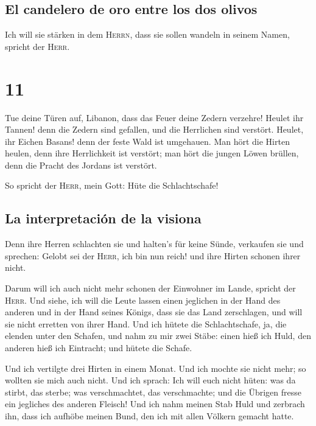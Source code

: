 \hypertarget{el-candelero-de-oro-entre-los-dos-olivos}{%
\subsection{El candelero de oro entre los dos
olivos}\label{el-candelero-de-oro-entre-los-dos-olivos}}

 Ich will sie stärken in dem \textsc{Herrn}, dass sie
sollen wandeln in seinem Namen, spricht der \textsc{Herr}.

\hypertarget{section-10}{%
\section{11}\label{section-10}}

 Tue deine Türen auf, Libanon, dass das Feuer deine Zedern
verzehre!  Heulet ihr Tannen! denn die Zedern sind
gefallen, und die Herrlichen sind verstört. Heulet, ihr Eichen Basans!
denn der feste Wald ist umgehauen.  Man hört die Hirten
heulen, denn ihre Herrlichkeit ist verstört; man hört die jungen Löwen
brüllen, denn die Pracht des Jordans ist verstört.

 So spricht der \textsc{Herr}, mein Gott: Hüte die
Schlachtschafe!

\hypertarget{la-interpretaciuxf3n-de-la-visiona}{%
\subsection{La interpretación de la
visiona}\label{la-interpretaciuxf3n-de-la-visiona}}

 Denn ihre Herren schlachten sie und halten's für keine
Sünde, verkaufen sie und sprechen: Gelobt sei der \textsc{Herr}, ich bin
nun reich! und ihre Hirten schonen ihrer nicht.

 Darum will ich auch nicht mehr schonen der Einwohner im
Lande, spricht der \textsc{Herr}. Und siehe, ich will die Leute lassen
einen jeglichen in der Hand des anderen und in der Hand seines Königs,
dass sie das Land zerschlagen, und will sie nicht erretten von ihrer
Hand.  Und ich hütete die Schlachtschafe, ja, die elenden
unter den Schafen, und nahm zu mir zwei Stäbe: einen hieß ich Huld, den
anderen hieß ich Eintracht; und hütete die Schafe.

 Und ich vertilgte drei Hirten in einem Monat. Und ich
mochte sie nicht mehr; so wollten sie mich auch nicht. 
Und ich sprach: Ich will euch nicht hüten: was da stirbt, das sterbe;
was verschmachtet, das verschmachte; und die Übrigen fresse ein
jegliches des anderen Fleisch!  Und ich nahm meinen Stab
Huld und zerbrach ihn, dass ich aufhöbe meinen Bund, den ich mit allen
Völkern gemacht hatte.

